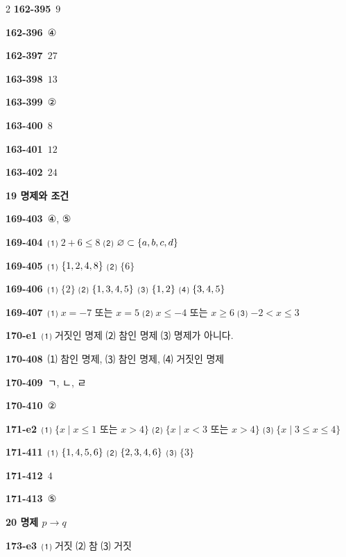 \documentclass[10pt,a4paper]{article}
\begin{document}
\begin{multicols}{2}
\noindent\textbf{162-395}\ $9$\par
\noindent\textbf{162-396}\ ④\par
\noindent\textbf{162-397}\ $27$\par
\noindent\textbf{163-398}\ $13$\par
\noindent\textbf{163-399}\ ②\par
\noindent\textbf{163-400}\ $8$\par
\noindent\textbf{163-401}\ $12$\par
\noindent\textbf{163-402}\ $24$\par
\noindent\textbf{19 명제와 조건}\par\smallskip
\noindent\textbf{169-403}\ ④, ⑤\par
\noindent\textbf{169-404}\ ⑴ $2+6\le 8$ ⑵ $\varnothing\subset\{a{,}\mkern3mu\mathopen{}b{,}\mkern3mu\mathopen{}c{,}\mkern3mu\mathopen{}d\}$\par
\noindent\textbf{169-405}\ ⑴ $\{1{,}\mkern3mu\mathopen{}2{,}\mkern3mu\mathopen{}4{,}\mkern3mu\mathopen{}8\}$ ⑵ $\{6\}$\par
\noindent\textbf{169-406}\ ⑴ $\{2\}$ ⑵ $\{1{,}\mkern3mu\mathopen{}3{,}\mkern3mu\mathopen{}4{,}\mkern3mu\mathopen{}5\}$ ⑶ $\{1{,}\mkern3mu\mathopen{}2\}$ ⑷ $\{3{,}\mkern3mu\mathopen{}4{,}\mkern3mu\mathopen{}5\}$\par
\noindent\textbf{169-407}\ ⑴ $x=-7$ 또는 $x=5$ ⑵ $x\le -4$ 또는 $x\ge 6$ ⑶ $-2<x\le 3$\par
\noindent\textbf{170-e1}\ ⑴ 거짓인 명제 ⑵ 참인 명제 ⑶ 명제가 아니다.\par
\noindent\textbf{170-408}\ ⑴ 참인 명제, ⑶ 참인 명제, ⑷ 거짓인 명제\par
\noindent\textbf{170-409}\ ㄱ, ㄴ, ㄹ\par
\noindent\textbf{170-410}\ ②\par
\noindent\textbf{171-e2}\ ⑴ $\{x \mid x\le 1$ 또는 $x>4\}$ ⑵ $\{x \mid x<3$ 또는 $x>4\}$ ⑶ $\{x \mid 3\le x\le 4\}$\par
\noindent\textbf{171-411}\ ⑴ $\{1{,}\mkern3mu\mathopen{}4{,}\mkern3mu\mathopen{}5{,}\mkern3mu\mathopen{}6\}$ ⑵ $\{2{,}\mkern3mu\mathopen{}3{,}\mkern3mu\mathopen{}4{,}\mkern3mu\mathopen{}6\}$ ⑶ $\{3\}$\par
\noindent\textbf{171-412}\ $4$\par
\noindent\textbf{171-413}\ ⑤\par
\noindent\textbf{20 명제 $p \rightarrow q$}\par\smallskip
\noindent\textbf{173-e3}\ ⑴ 거짓 ⑵ 참 ⑶ 거짓\par

\end{multicols}
\end{document}
